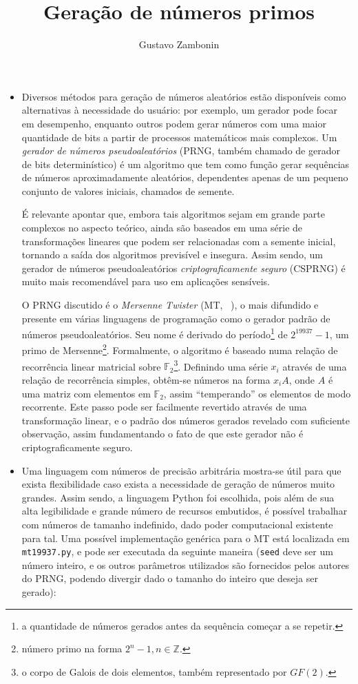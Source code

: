 \documentclass{../sftex/sftex}
\title{Geração de números primos}
\author{Gustavo Zambonin}
\begin{document}
\maketitle

\begin{itemize}

\item Diversos métodos para geração de números aleatórios estão disponíveis
como alternativas à necessidade do usuário: por exemplo, um gerador pode focar
em desempenho, enquanto outros podem gerar números com uma maior quantidade de
bits a partir de processos matemáticos mais complexos. Um \emph{gerador de
números pseudoaleatórios} (PRNG, também chamado de gerador de bits
determinístico) é um algoritmo que tem como função gerar sequências de números
aproximadamente aleatórios, dependentes apenas de um pequeno conjunto de
valores iniciais, chamados de semente.

É relevante apontar que, embora tais algoritmos sejam em grande parte
complexos no aspecto teórico, ainda são baseados em uma série de
transformações lineares que podem ser relacionadas com a semente inicial,
tornando a saída dos algoritmos previsível e insegura. Assim sendo, um gerador
de números pseudoaleatórios \emph{criptograficamente seguro} (CSPRNG) é muito
mais recomendável para uso em aplicações sensíveis.

O PRNG discutido é o \emph{Mersenne Twister} (MT,
~\cite{Matsumoto:1998:MTE:272991.272995}), o mais difundido e presente em
várias linguagens de programação como o gerador padrão de números
pseudoaleatórios. Seu nome é derivado do período\footnote{a quantidade de
números gerados antes da sequência começar a se repetir.} de $2^{19937} - 1$,
um primo de Mersenne\footnote{número primo na forma $2^n - 1, n \in
\mathbb{Z}$.}. Formalmente, o algoritmo é baseado numa relação de recorrência
linear matricial sobre $\mathbb{F}_2$\footnote{o corpo de Galois de dois
elementos, também representado por $GF(2)$.}. Definindo uma série $x_i$
através de uma relação de recorrência simples, obtêm-se números na forma $x_i
A$, onde $A$ é uma matriz com elementos em $\mathbb{F}_2$, assim
``temperando'' os elementos de modo recorrente. Este passo pode ser facilmente
revertido através de uma transformação linear, e o padrão dos números gerados
revelado com suficiente observação, assim fundamentando o fato de que este
gerador não é criptograficamente seguro.

\item Uma linguagem com números de precisão arbitrária mostra-se útil para que
exista flexibilidade caso exista a necessidade de geração de números muito
grandes. Assim sendo, a linguagem Python foi escolhida, pois além de sua alta
legibilidade e grande número de recursos embutidos, é possível trabalhar com
números de tamanho indefinido, dado poder computacional existente para tal.
Uma possível implementação genérica para o MT está localizada em
\verb!mt19937.py!, e pode ser executada da seguinte maneira (\verb!seed! deve
ser um número inteiro, e os outros parâmetros utilizados são fornecidos pelos
autores do PRNG, podendo divergir dado o tamanho do inteiro que deseja ser
gerado):


\end{itemize}
\end{document}
